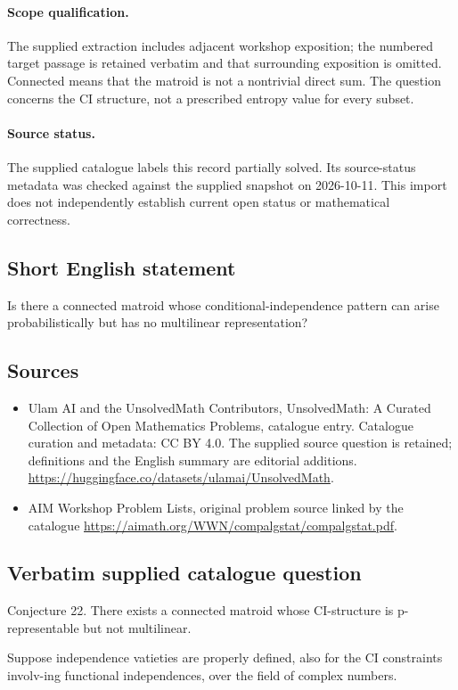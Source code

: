 \documentclass[11pt]{article}
\begin{document}
\paragraph{Scope qualification.}
The supplied extraction includes adjacent workshop exposition; the numbered target passage is retained verbatim and that surrounding exposition is omitted. Connected means that the matroid is not a nontrivial direct sum. The question concerns the CI structure, not a prescribed entropy value for every subset.
\paragraph{Source status.}
The supplied catalogue labels this record partially solved. Its source-status metadata was checked against the supplied snapshot on 2026-10-11. This import does not independently establish current open status or mathematical correctness.
\subsection{Short English statement}
Is there a connected matroid whose conditional-independence pattern can arise probabilistically but has no multilinear representation?
\subsection{Sources}
\begin{itemize}
\item[S1] Ulam AI and the UnsolvedMath Contributors, UnsolvedMath: A Curated Collection of Open Mathematics Problems, catalogue entry. Catalogue curation and metadata: CC BY 4.0. The supplied source question is retained; definitions and the English summary are editorial additions.
\url{https://huggingface.co/datasets/ulamai/UnsolvedMath}.
\item[S2] AIM Workshop Problem Lists, original problem source linked by the catalogue
\url{https://aimath.org/WWN/compalgstat/compalgstat.pdf}.
\end{itemize}
\subsection{Verbatim supplied catalogue question}
Conjecture 22. There exists a connected matroid whose CI-structure is p-representable but not multilinear.

Suppose independence vatieties are properly defined, also for the CI constraints involv-ing functional independences, over the field of complex numbers.
\end{document}
